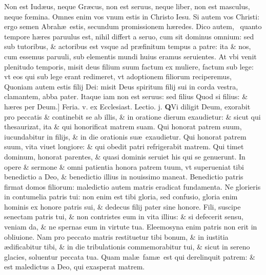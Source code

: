 \documentclass[a5paper,10pt]{book}
\def\leftmarginnote{%
	\lrmarginnote{\hskip -\marginparsep \hskip -6.5em}}
\def\rightmarginnote{%
	\lrmarginnote{\hskip\columnwidth \hskip -1em}}
\def\ae{æ}
\def\oe{œ}
\begin{document}
\begin{multicols*}{2}
Non est Iud\ae us,
neque Gr\ae cus, non est seruus, neque liber, non est masculus, neque f\oe mina.
Omnes enim vos vnum estis in Christo Iesu. Si autem vos Christi: ergo semen Abrah\ae \ estis, secundum promissionem h\ae redes.
Dico autem, \textdagger \ quanto\leftmarginnote{\begin{flushright}c.4.a\end{flushright}} tempore h\ae res paruulus est, nihil differt a seruo, cum sit dominus omnium: sed sub tutoribus, \& actoribus est vsque ad pr\ae finitum tempus a patre: ita \& nos, cum essemus paruuli, sub elementis mundi huius eramus seruientes.
At vbi venit plenitudo temporis, misit deus filium suum factum ex muliere, factum sub lege: vt eos qui sub lege erant redimeret, vt adoptionem filiorum reciperemus, Quoniam autem estis filij Dei: misit Deus spiritum filij sui in corda vestra, clamantem, abba pater.
Itaque iam non est seruus: sed filius Quod si filius: \& h\ae res per Deum.]
\newline {} \color{red} \hypertarget{THU-PRIMA-VAGAN}{Feria. v.} ex Ecclesiast. Lectio. j. \color{black}
\vspace{-.25em}
\lettrine[lines=2]{\bfseries Q}{}Vi\rightmarginnote{ca. 3.} diligit Deum, exorabit pro peccatis \& continebit se ab illis, \& in oratione dierum exaudietur: \& sicut qui thesaurizat, ita \& qui honorificat matrem suam.
Qui honorat patrem suum, iucundabitur in filijs, \& in die orationis su\ae \ exaudietur. Qui honorat patrem suum, vita viuet longiore: \& qui obedit patri refrigerabit matrem.
Qui timet dominum, honorat parentes, \& quasi dominis seruiet his qui se genuerunt. In opere \& sermone \& omni patientia honora patrem tuum, vt superueniat tibi benedictio a Deo, \& benedictio illius in nouissimo maneat.
Benedictio patris firmat domos filiorum: maledictio autem matris eradicat fundamenta. Ne glorieris in contumelia patris tui: non enim est tibi gloria, sed confusio, gloria enim hominis ex honore patris sui, \& dedecus filij pater sine honore.
Fili, suscipe senectam patris tui, \& non contristes eum in vita illius: \& si defecerit sensu, veniam da, \& ne spernas eum in virtute tua. Eleemosyna enim patris non erit in obliuione.
Nam pro peccato matris restituetur tibi bonum, \& in iustitia \ae dificabitur tibi, \& in die tribulationis commemorabitur tui, \& sicut in sereno glacies, soluentur peccata tua.
Quam mal\ae \ fam\ae \ est qui derelinquit patrem: \& est maledictus a Deo, qui exasperat matrem.
\fancyhead[C]{\color{red} Feria. v. Dominic\ae . j. Vagantium}

\end{multicols*}
\end{document}
